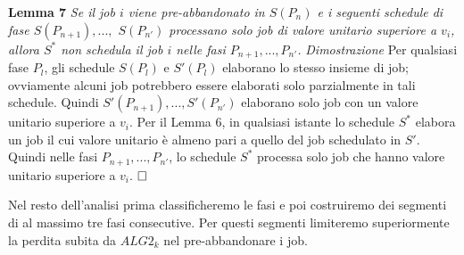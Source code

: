 \documentclass[twoside,openany,titlepage,fleqn,
	headinclude,12pt,a4paper,BCOR5mm,footinclude]{scrbook}
\begin{document}
\textbf{Lemma 7}
\textit{Se il job $i$ viene pre-abbandonato in $S(P_{n})$ e i seguenti schedule di fase $S(P_{n + 1}), . . . ,$ $S(P_{n'})$ processano solo job di valore unitario superiore a $v_{i}$, allora $S^{*}$ non schedula il job $i$ nelle fasi $P_{n + 1}, . . . , P_{n'}$.}
\newline \newline
\textit{Dimostrazione}
Per qualsiasi fase $P_{l}$, gli schedule $S(P_{l})$ e $S'(P_{l})$ elaborano lo stesso insieme di job; ovviamente alcuni job potrebbero essere elaborati solo parzialmente in tali schedule. Quindi $S'(P_{n + 1}), . . . , S'(P_{n'})$ elaborano solo job con un valore unitario superiore a $v_{i}$. Per il Lemma 6, in qualsiasi istante lo schedule $S^*$ elabora un job il cui valore unitario è almeno pari a quello del job schedulato in $S'$. Quindi nelle fasi $P_{n + 1}, . . . , P_{n'}$, lo schedule $S^{*}$ processa solo job che hanno valore unitario superiore a $v_{i}$. $\hfill \square$

Nel resto dell'analisi prima classificheremo le fasi e poi costruiremo dei segmenti di al massimo tre fasi consecutive. Per questi segmenti limiteremo superiormente la perdita subita da $ALG2_{k}$ nel pre-abbandonare i job.
\end{document}
